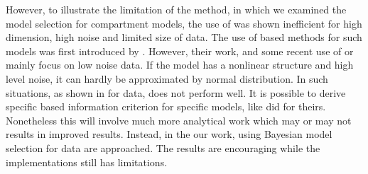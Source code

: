 However, to illustrate the limitation of the \aicc method, in
\textcite{Zhou:2011uo} which we examined the model selection for compartment
models, the use of \aicc was shown inefficient for high dimension, high noise
and limited size of data. The use of \aic based methods for such models was
first introduced by \textcite{Hawkins:1986ha}. However, their work, and some
recent use of \aic or \aicc mainly focus on low noise data. If the model has a
nonlinear structure and high level noise, it can hardly be approximated by
normal distribution. In such situations, as shown in \textcite{Zhou:2011uo}
for \pet data, \aicc does not perform well. It is possible to derive specific
\aic based information criterion for specific models, like
\textcite{Hurvich:1989ev} did for theirs. Nonetheless this will involve much
more analytical work which may or may not results in improved results.
Instead, in the our work, using Bayesian model selection for \pet data are
approached. The results are encouraging while the implementations still has
limitations.
